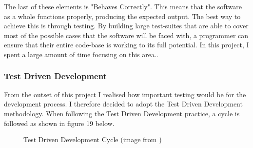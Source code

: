 The last of these elements is "Behaves Correctly". This means that the software as a whole functions properly, producing the expected output. The best way to achieve this is through testing. By building large test-suites that are able to cover most of the possible cases that the software will be faced with, a programmer can ensure that their entire code-base is working to its full potential. In this project, I spent a large amount of time focusing on this area..

\subsubsection{Test Driven Development \label{TDD}}
From the outset of this project I realised how important testing would be for the development process. I therefore decided to adopt the Test Driven Development methodology. When following the Test Driven Development practice, a cycle is followed as shown in figure 19 below.

\begin{figure}[!ht]
	\centering
	\caption{Test Driven Development Cycle (image from \cite{SED})}
\end{figure}

